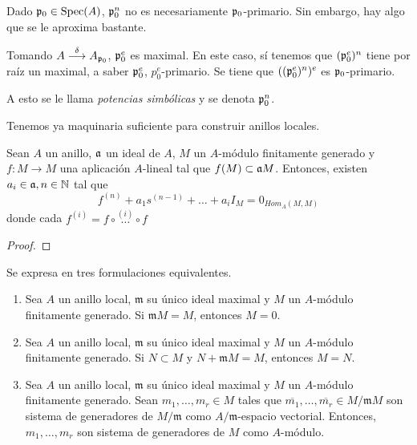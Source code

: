\documentclass[../main.tex]{subfiles}
\begin{document}
\begin{remark}
Dado $\mathfrak{p}_0\in\operatorname{Spec}(A)$, $\mathfrak{p}_0^n$ no es necesariamente $\mathfrak{p}_0$-primario. Sin embargo, hay algo que se le aproxima bastante.

Tomando $A\overset{\delta}{\longrightarrow}A_{\mathfrak{p}_0}$, $\mathfrak{p}_0^e$ es maximal. En este caso, sí tenemos que $(\mathfrak{p}_0^e)^n$ tiene por raíz un maximal, a saber $\mathfrak{p}_0^e$, $p_0^e$-primario. Se tiene que $((\mathfrak{p}_0^e)^n)^e$ es $\mathfrak{p}_0$-primario.

A esto se le llama \textit{potencias simbólicas} y se denota $\mathfrak{p}_0^n$.
\end{remark}
Tenemos ya maquinaria suficiente para construir anillos locales.
\begin{theorem} Sean $A$ un anillo, $\mathfrak{a}$ un ideal de $A$, $M$ un $A$-módulo finitamente generado y $f:M\longrightarrow M$ una aplicación $A$-lineal tal que $f(M)\subset \mathfrak{a} M$. Entonces, existen $a_i\in\mathfrak{a}, n\in\mathbb{N}$ tal que $$f^{(n)}+a_1s^{(n-1)}+\dots+a_iI_M=0_{Hom_A(M,M)}$$
donde cada $f^{(i)}=f\circ\overset{(i)}{\dots}\circ f$
\end{theorem}
\begin{proof}

\end{proof}
\begin{lemma}Se expresa en tres formulaciones equivalentes.\begin{enumerate}
    \item Sea $A$ un anillo local, $\mathfrak{m}$ su único ideal maximal y $M$ un $A$-módulo finitamente generado. Si $\mathfrak{m} M=M$, entonces $M=0$.
    \item Sea $A$ un anillo local, $\mathfrak{m}$ su único ideal maximal y $M$ un $A$-módulo finitamente generado. Si $N\subset M$ y $N+\mathfrak{m}M=M$, entonces $M=N$.
    \item Sea $A$ un anillo local, $\mathfrak{m}$ su único ideal maximal y $M$ un $A$-módulo finitamente generado. Sean $m_1,\dots,m_r\in M$ tales que $\overline{m_1},\dots,\overline{m_r}\in M/\mathfrak{m}M$ son sistema de generadores de $M/\mathfrak{m}$ como $A/\mathfrak{m}$-espacio vectorial. Entonces, $m_1,\dots,m_r$ son sistema de generadores de $M$ como $A$-módulo.
\end{enumerate}
\end{lemma}
\end{document}
